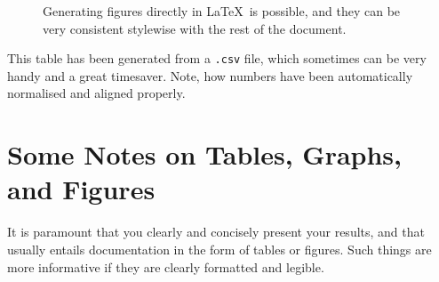 \begin{figure}
  \myfloatalign
  \caption[A graph with error bars]{Generating figures directly in \LaTeX\ is possible, and they can be very consistent stylewise with the rest of the document.}
  \label{fig:pretty-graph}
\end{figure}



\begin{table}
  \myfloatalign
  \caption[An auto-generated table]{This table has been generated from a
    \texttt{.csv} file, which sometimes can be very handy and a great timesaver. Note, how numbers have been automatically normalised and aligned properly.}
  \label{tab:pretty-table}
\end{table}



\section{Some Notes on Tables, Graphs, and Figures}
\label{sec:some-notes-tables}

It is paramount that you clearly and concisely present your results, and
that usually entails documentation in the form of tables or figures.  Such
things are more informative if they are clearly formatted and legible.

